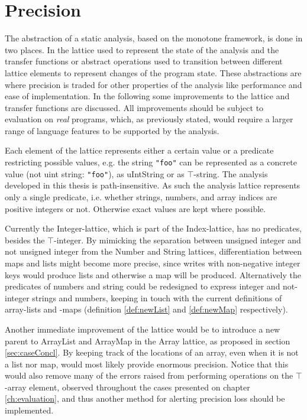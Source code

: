 \section{Precision}
\label{sec:future2}
The abstraction of a static analysis, based on the monotone framework, is done in two places. In the lattice used to represent the state of the analysis and the transfer functions or abstract operations used to transition between different lattice elements to represent changes of the program state. These abstractions are where precision is traded for other properties of the analysis like performance and ease of implementation. In the following some improvements to the lattice and transfer functions are discussed. All improvements should be subject to evaluation on \textit{real} programs, which, as previously stated, would require a larger range of language features to be supported by the analysis. 

Each element of the lattice represents either a certain value or a predicate restricting possible values, e.g. the string \texttt{"foo"} can be represented as a concrete value (not uint string: \texttt{"foo"}), as uIntString or as $\top$-string. The analysis developed in this thesis is path-insensitive. As such the analysis lattice represents only a single predicate, i.e. whether strings, numbers, and array indices are positive integers or not. Otherwise exact values are kept where possible. 

Currently the Integer-lattice, which is part of the Index-lattice, has no predicates, besides the $\top$-integer. By mimicking the separation between unsigned integer and not unsigned integer from the Number and String lattices, differentiation between maps and lists might become more precise, since writes with non-negative integer keys would produce lists and otherwise a map will be produced. Alternatively the predicates of numbers and string could be redesigned to express integer and not-integer strings and numbers, keeping in touch with the current definitions of array-lists and -maps (definition \ref{def:newList} and \ref{def:newMap} respectively). 

Another immediate improvement of the lattice would be to introduce a new parent to ArrayList and ArrayMap in the Array lattice, as proposed in section \ref{sec:caseConcl}. By keeping track of the locations of an array, even when it is not a list nor map, would most likely provide enormous precision. Notice that this would also remove many of the errors raised from performing operations on the $\top$-array element, observed throughout the cases presented on chapter \ref{ch:evaluation}, and thus another method for alerting precision loss should be implemented. 

